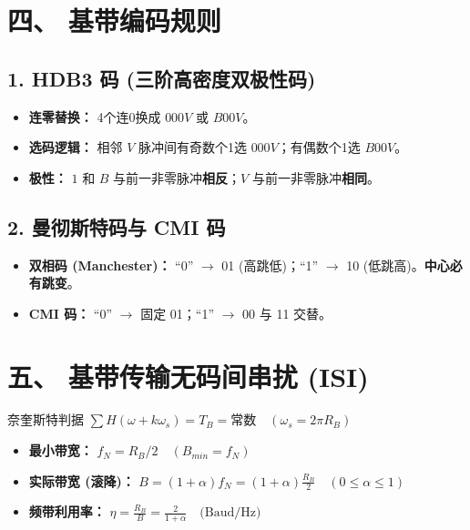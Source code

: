 \documentclass[11pt,a4paper]{ctexart} %
\begin{document}
\section{四、 基带编码规则}
\subsection{1. HDB3 码 (三阶高密度双极性码)}
\begin{itemize}
    \item \textbf{连零替换：} 4个连0换成 $000V$ 或 $B00V$。
    \item \textbf{选码逻辑：} 相邻 $V$ 脉冲间有奇数个1选 $000V$；有偶数个1选 $B00V$。
    \item \textbf{极性：} $1$ 和 $B$ 与前一非零脉冲\textbf{相反}；$V$ 与前一非零脉冲\textbf{相同}。
\end{itemize}

\subsection{2. 曼彻斯特码与 CMI 码}
\begin{itemize}
    \item \textbf{双相码 (Manchester)：} “0” $\to$ 01 (高跳低)；“1” $\to$ 10 (低跳高)。\textbf{中心必有跳变}。
    \item \textbf{CMI 码：} “0” $\to$ 固定 01；“1” $\to$ 00 与 11 交替。
\end{itemize}

\section{五、 基带传输无码间串扰 (ISI)}
\begin{formulaBox}{奈奎斯特判据}
    $\sum H(\omega + k\omega_s) = T_B = \text{常数} \quad (\omega_s = 2\pi R_B)$
\end{formulaBox}
\begin{itemize}
    \item \textbf{最小带宽：} $f_N = R_B/2 \quad (B_{min} = f_N)$
    \item \textbf{实际带宽 (滚降)：} $B = (1+\alpha)f_N = (1+\alpha)\frac{R_B}{2} \quad (0 \le \alpha \le 1)$
    \item \textbf{频带利用率：} $\eta = \frac{R_B}{B} = \frac{2}{1+\alpha} \quad \text{(Baud/Hz)}$
\end{itemize}
\end{document}
